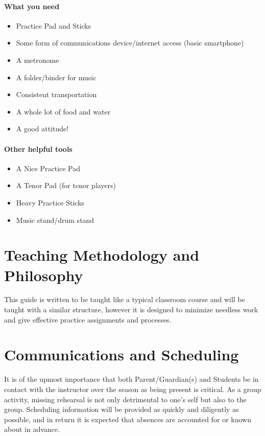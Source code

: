 \documentclass[12pt,letterpaper]{book}
\begin{document}
\paragraph{What you need}
\begin{itemize}
    \item Practice Pad and Sticks
    \item Some form of communications device/internet access (basic smartphone)
    \item A metronome
    \item A folder/binder for music
    \item Consistent transportation
    \item A whole lot of food and water
    \item A good attitude!
\end{itemize}

\paragraph{Other helpful tools}
\begin{itemize}
    \item A Nice Practice Pad
    \item A Tenor Pad (for tenor players)
    \item Heavy Practice Sticks
    \item Music stand/drum stand
\end{itemize}


\section{Teaching Methodology and Philosophy}

This guide is written to be taught like a typical classroom course and will be taught with a similar structure, however it is designed to minimize needless work and give effective practice assignments and processes.

\section{Communications and Scheduling}

It is of the upmost importance that both Parent/Guardian(s) and Students be in contact with the instructor over the season as being present is critical.  As a group activity, missing rehearsal is not only detrimental to one's self but also to the group.  Scheduling information will be provided as quickly and diligently as possible, and in return it is expected that absences are accounted for or known about in advance.  
\end{document}
